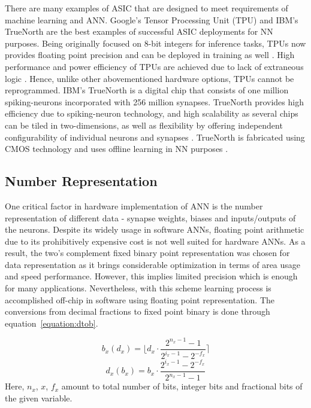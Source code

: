 There are many examples of ASIC that are designed to meet requirements of machine learning and ANN. Google’s Tensor Processing Unit (TPU) and IBM’s TrueNorth are the best examples of successful ASIC deployments for NN purposes. Being originally focused on 8-bit integers for inference tasks, TPUs now provides floating point precision and can be deployed in training as well \cite{pooja2018}. High performance and power efficiency of TPUs are achieved due to lack of extraneous logic \cite{pooja2018}. Hence, unlike other abovementioned hardware options, TPUs cannot be reprogrammed. IBM’s TrueNorth is a digital chip that consists of one million spiking-neurons incorporated with 256 million synapses. TrueNorth provides high efficiency due to spiking-neuron technology, and high scalability as several chips can be tiled in two-dimensions, as well as flexibility by offering independent configurability of individual neurons and synapses \cite{Merolla668}. TrueNorth is fabricated using CMOS technology and uses offline learning in NN purposes \cite{Merolla668}.
   

\subsection{Number Representation}

One critical factor in hardware implementation of ANN is the number representation of different data - synapse weights, biases and inputs/outputs of the neurons. Despite its widely usage in software ANNs, floating point arithmetic due to its prohibitively expensive cost is not well suited for hardware ANNs. As a result, the two's complement fixed binary point representation was chosen for data representation as it brings considerable optimization in terms of area usage and speed performance. However, this implies limited precision which is enough for many applications. Nevertheless, with this scheme learning process is accomplished off-chip in software using floating point representation. The conversions from decimal fractions to fixed point binary is done through equation~\ref{equation:dtob}.

\begin{equation}
b_{x}(d_{x})= \lfloor{d_{x}\cdot \frac{2^{n_{x}-1}-1}{2^{i_{x}-1}-2^{-f_{x}}}}\rceil
\label{equation:dtob}
\end{equation}
\begin{equation}
d_{x}(b_{x})= {b_{x}\cdot \frac{2^{i_{x}-1}-2^{-f_{x}}}{2^{n_{x}-1}-1}}
\label{equation:btod}
\end{equation}
Here, $n_{x}$, ${x}$, $f_{x}$ amount to total number of bits, integer bits and fractional bits of the given variable.
